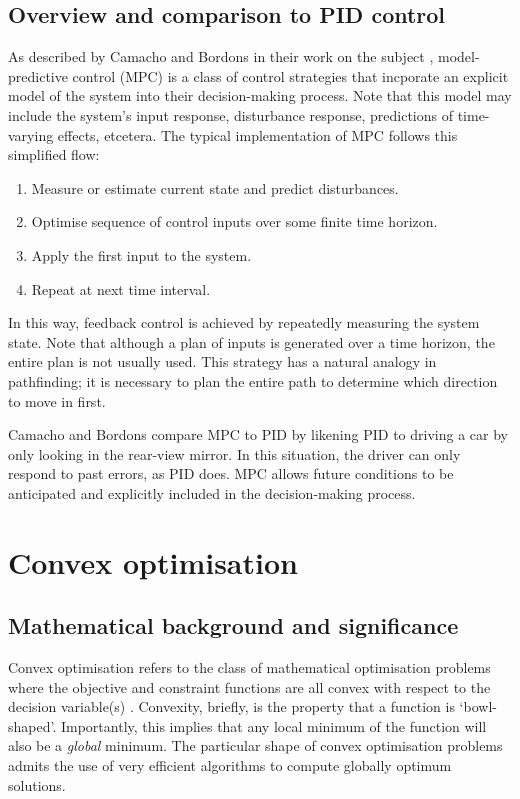 \subsection{Overview and comparison to PID control}

As described by Camacho and Bordons in their work on the subject \cite{Camacho04}, model-predictive control (MPC) is a class of control strategies that incporate an explicit model of the system into their decision-making process.
Note that this model may include the system's input response, disturbance response, predictions of time-varying effects, etcetera.
The typical implementation of MPC follows this simplified flow:

\begin{enumerate}
	\item Measure or estimate current state and predict disturbances.
	\item Optimise sequence of control inputs over some finite time horizon.
	\item Apply the first input to the system.
	\item Repeat at next time interval.
\end{enumerate}

In this way, feedback control is achieved by repeatedly measuring the system state.
Note that although a plan of inputs is generated over a time horizon, the entire plan is not usually used.
This strategy has a natural analogy in pathfinding; it is necessary to plan the entire path to determine which direction to move in first.

Camacho and Bordons compare MPC to PID by likening PID to driving a car by only looking in the rear-view mirror.
In this situation, the driver can only respond to past errors, as PID does.
MPC allows future conditions to be anticipated and explicitly included in the decision-making process.

\section{Convex optimisation}

\subsection{Mathematical background and significance}

Convex optimisation refers to the class of mathematical optimisation problems where the objective and constraint functions are all convex with respect to the decision variable(s) \cite{Boyd04}.
Convexity, briefly, is the property that a function is `bowl-shaped'.
Importantly, this implies that any local minimum of the function will also be a {\it global} minimum.
The particular shape of convex optimisation problems admits the use of very efficient algorithms to compute globally optimum solutions.

